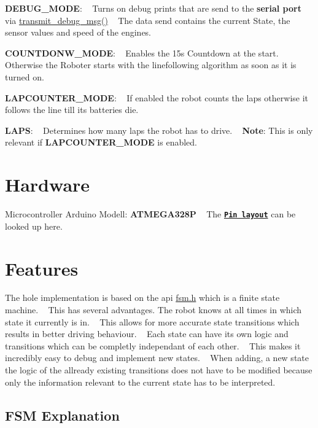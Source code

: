 \begin{DoxyItemize}
\item {\bfseries D\+E\+B\+U\+G\+\_\+\+M\+O\+DE}\+: ~\newline
 Turns on debug prints that are send to the {\bfseries serial port} via \hyperlink{usart_8c_a2744fce10359c4e63ba8fcb65e7d92d2}{transmit\+\_\+debug\+\_\+msg()} ~\newline
 The data send contains the current State, the sensor values and speed of the engines.
\item {\bfseries C\+O\+U\+N\+T\+D\+O\+N\+W\+\_\+\+M\+O\+DE}\+: ~\newline
 Enables the 15s Countdown at the start. ~\newline
 Otherwise the Roboter starts with the linefollowing algorithm as soon as it is turned on.
\item {\bfseries L\+A\+P\+C\+O\+U\+N\+T\+E\+R\+\_\+\+M\+O\+DE}\+: ~\newline
 If enabled the robot counts the laps otherwise it follows the line till it\textquotesingle{}s batteries die.
\item {\bfseries L\+A\+PS}\+: ~\newline
 Determines how many laps the robot has to drive. ~\newline
 {\bfseries Note}\+: This is only relevant if {\bfseries L\+A\+P\+C\+O\+U\+N\+T\+E\+R\+\_\+\+M\+O\+DE} is enabled.
\end{DoxyItemize}\hypertarget{index_Hardware}{}\section{Hardware}\label{index_Hardware}
Microcontroller Arduino Modell\+: {\bfseries A\+T\+M\+E\+G\+A328P} ~\newline
The \href{pin_layout.pdf}{\tt {\bfseries Pin layout}} can be looked up here.\hypertarget{index_Features}{}\section{Features}\label{index_Features}
The hole implementation is based on the api \hyperlink{fsm_8h}{fsm.\+h} which is a finite state machine. ~\newline
This has several advantages. The robot knows at all times in which state it currently is in. ~\newline
This allows for more accurate state transitions which results in better driving behaviour. ~\newline
Each state can have its own logic and transitions which can be completly independant of each other. ~\newline
This makes it incredibly easy to debug and implement new states. ~\newline
 When adding, a new state the logic of the allready existing transitions does not have to be modified because only the information relevant to the current state has to be interpreted.\hypertarget{index_fsm_explanation}{}\subsection{F\+S\+M Explanation}\label{index_fsm_explanation}

